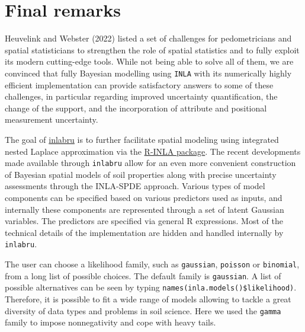 \documentclass[
  a4paper,
]{article}
\begin{document}
\hypertarget{final-remarks}{%
\section{Final remarks}\label{final-remarks}}

Heuvelink and Webster (2022) listed a set of challenges for
pedometricians and spatial statisticians to strengthen the role of
spatial statistics and to fully exploit its modern cutting-edge tools.
While not being able to solve all of them, we are convinced that fully
Bayesian modelling using \texttt{INLA} with its numerically highly
efficient implementation can provide satisfactory answers to some of
these challenges, in particular regarding improved uncertainty
quantification, the change of the support, and the incorporation of
attribute and positional measurement uncertainty.

The goal of \href{http://inlabru.org/}{inlabru} is to further facilitate
spatial modeling using integrated nested Laplace approximation via the
\href{https://www.r-inla.org/}{R-INLA package}. The recent developments
made available through \texttt{inlabru} allow for an even more
convenient construction of Bayesian spatial models of soil properties
along with precise uncertainty assessments through the INLA-SPDE
approach. Various types of model components can be specified based on
various predictors used as inputs, and internally these components are
represented through a set of latent Gaussian variables. The predictors
are specified via general R expressions. Most of the technical details
of the implementation are hidden and handled internally by
\texttt{inlabru}.

The user can choose a likelihood family, such as \texttt{gaussian},
\texttt{poisson} or \texttt{binomial}, from a long list of possible
choices. The default family is \texttt{gaussian}. A list of possible
alternatives can be seen by typing
\texttt{names(inla.models()\$likelihood)}. Therefore, it is possible to
fit a wide range of models allowing to tackle a great diversity of data
types and problems in soil science. Here we used the \texttt{gamma}
family to impose nonnegativity and cope with heavy tails.
\end{document}
